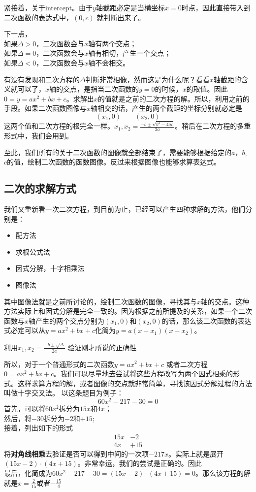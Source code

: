 紧接着，关于\gls{intercept}。由于$y$轴截距必定是当横坐标$x=0$时点，因此直接带入到二次函数的表达式中，$(0,c)$ 就判断出来了。

下一点，\\
如果$\Delta>0$，二次函数会与$x$轴有两个交点；\\
如果$\Delta=0$，二次函数会与$x$轴有相切，产生一个交点；\\
如果$\Delta<0$，二次函数会与$x$轴不会相交。

有没有发现和二次方程的$\Delta$判断非常相像，然而这是为什么呢？看看$x$轴截距的含义就可以了，$x$轴的交点，是指当二次函数的$y=0$的时候，$x$的取值。因此$0=y=ax^2+bx+c$。求解出$x$的值就是之前的二次方程的解。所以，利用之前的手段。如果二次函数图像与$x$轴相交的话，产生的两个截距的坐标分别就必定是
\[
	(x_1,0) \qquad (x_2,0)
\]
这两个值和二次方程的根完全一样。$x_1, x_2=\frac{-b\pm \sqrt{b^2-4ac}}{2a}$。稍后在二次方程的多重形式中，我们会用到。

至此，我们所有的关于二次函数的图像就全部结束了，需要能够根据给定的$a$，$b$, $c$的值，绘制二次函数的函数图像。反过来根据图像也能够求算表达式。

\subsection*{二次的求解方式}
\label{subsec:Ways of Solving Quadratic Equation}
我们又重新看一次二次方程，到目前为止，已经可以产生四种求解的方法，他们分别是：
\begin{itemize}
	\item 配方法
	\item 求根公式法
	\item 因式分解，十字相乘法
	\item 图像法
\end{itemize}

其中图像法就是之前所讨论的，绘制二次函数的图像，寻找其与$x$轴的交点。这种方法实际上和因式分解是完全一致的。因为根据之前所提及的关系，如果一个二次函数与$x$轴产生的两个交点分别为$(x_1,0)$和$(x_2,0)$的话，那么该二次函数的表达式必定可以从$y=ax^2+bx+c$化简为$y=a(x-x_1)(x-x_2)$。

\begin{TaskBox}  %
利用$x_1,x_2=\frac{-b\pm\sqrt{\Delta}}{2a}$ 验证刚才所说的正确性
\end{TaskBox}

所以，对于一个普通形式的二次函数$y=ax^2+bx+c$ 或者二次方程$0=ax^2+bx+c$。我们可以尽量地去尝试将这些方程改写为两个因式相乘的形式。这样求算方程的解，或者图像的交点就非常简单，寻找该因式分解过程的方法叫做十字交叉法。
以这条题目为例子：
\[
	60x^2-217-30=0
\]
首先，可以将$60x^2$拆分为$15x$和$4x$；\\
然后，将$-30$拆分为$-2$和$+15$;\\
接着，列出如下的形式
\[
\begin{matrix}
15x & -2\\
4x & +15
\end{matrix}
\]
将\textbf{对角线相乘}去验证是否可以得到中间的一次项$-217x$。实际上就是展开$(15x-2)\cdot(4x+15)$。非常幸运，我们的尝试是正确的。因此\\
最后，化简成为$60x^2-217-30=(15x-2)\cdot(4x+15)=0$。那么该方程的解就是$x=\frac{2}{15}$或者$-\frac{15}{4}$


